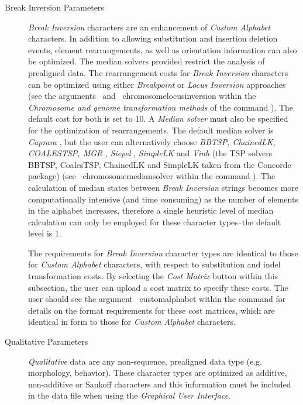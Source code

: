 \begin{description}
\item [Break Inversion Parameters] \emph{Break Inversion} characters are an enhancement of 				
\emph{Custom Alphabet} characters. In addition to allowing substitution and insertion deletion events, 
element rearrangements, as well as orientation information can also be optimized.
The median solvers provided restrict the analysis of prealigned data. 
The rearrangement costs for \emph{Break Inversion} characters can be optimized using 
either \emph{Breakpoint} or \emph{Locus Inversion} approaches (see the 
arguments~ and~
{chromosomelocusinversion} within the \emph{Chromosome and genome transformation methods} 
of the command ). The default cost for both is set to 10. A \emph{Median solver} 
must also be specified for the optimization of rearrangements. The default median solver is \emph{Caprara}
\cite{Caprara2001}, but the user can alternatively choose \emph{BBTSP, ChainedLK, COALESTSP, MGR} 
\cite{bourqueandpevzner2002}, \emph{Siepel} \cite{siepelmoret2001}, \emph{SimpleLK} and 
\emph{Vinh} (the TSP solvers BBTSP, CoalesTSP, 
ChainedLK and SimpleLK taken from the Concorde package) (see~
{chromosomemediansolver}  within the command ).  
The calculation of median states between \emph {Break Inversion} strings becomes more 
computationally intensive (and time consuming) as the number of elements in the alphabet 
increases, therefore a single heuristic level of median calculation can only be employed 
for these character types--the default level is 1.

\indent The requirements for \emph{Break Inversion} character types are identical to those for 
\emph{Custom Alphabet} characters, with respect to substitution and indel transformation costs. 
By selecting the  \emph{Cost Matrix} button within this subsection, the user can upload a 
cost matrix to specify these costs. The user should see the argument~
{customalphabet} within the command  for details on the format requirements 
for these cost matrices, which are identical in form to those for \emph{Custom Alphabet} characters.

\item [Qualitative Parameters] \emph{Qualitative} data are any non-sequence, prealigned 
data type (e.g. morphology, behavior). These character types are optimized as additive, 
non-additive or Sankoff characters and this information must be included in the data file when 
using the \emph{Graphical User Interface}.

\end{description}

